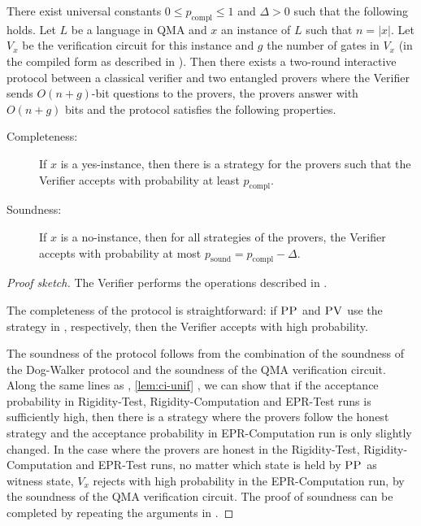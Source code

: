 \documentclass{toc}
\DeclareMathOperator{\sound}{sound}
\DeclareMathOperator{\compl}{compl}
\newcommand{\pv}{\textsc{PV}}
\newcommand{\pp}{\textsc{PP}}
\begin{document}
\begin{lemma}\label{lem:qma}
There %
exist  %
universal constants
$0\leq p_{\compl}\leq 1$   %
and $\Delta >0$ such that the following holds. 
Let $L$ be a language in QMA and $x$ an instance of $L$ such that $n = |x|$. Let  $V_x$ be the
  verification circuit for this instance and $g$ the number of gates in $V_x$
  (in the compiled form as described in ). Then there exists a two-round interactive protocol
between a classical verifier and two entangled provers where the Verifier
sends  $O(n + g)$-bit questions to the provers, the provers answer with $O(n + g)$ bits and the protocol satisfies the following properties.
\begin{description}
\item[Completeness:] If $x$ is a yes-instance, then  there is a strategy for the provers such that the Verifier accepts with probability  at least
$p_{\compl}$.
\item[Soundness:] If $x$ is a no-instance, then for all strategies of the provers, the Verifier accepts with  probability at most
$p_{\sound} = p_{\compl} - \Delta$.  %
\end{description}
\end{lemma}
\begin{proof}[Proof sketch]
The Verifier performs the operations described in . 

  The completeness of the protocol is straightforward: if $\pp$ and $\pv$ use the strategy in  , respectively, then the Verifier accepts with  high probability.

  The soundness of the protocol follows from the combination of the soundness of the
  Dog-Walker protocol and the soundness of the QMA verification circuit. Along the same lines as 
  , \ref{lem:ci-unif} ,
  we can show that if
  the acceptance probability in Rigidity-Test, Rigidity-Computation and
  EPR-Test runs
  is sufficiently high, then there is a strategy where the provers follow the honest
  strategy and the acceptance probability in EPR-Computation run is only slightly
  changed.  
  In the case where the provers are honest in the Rigidity-Test, Rigidity-Computation and EPR-Test runs, no matter which state is held
  by $\pp$ as witness state, $V_x$ rejects with high probability in the EPR-Computation run, by the
  soundness of the QMA verification circuit.  The proof of soundness can be completed by repeating the
  arguments in .
\end{proof}
\end{document}
